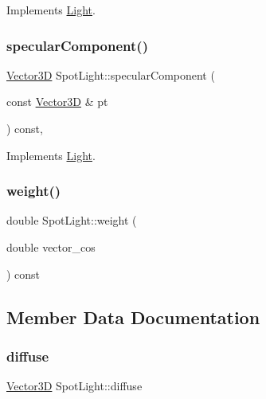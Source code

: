 Implements \mbox{\hyperlink{classLight_ac075908cf22e9ca9f289c1226d133664}{Light}}.

\mbox{\label{classSpotLight_a6a1cc6970bbb3308b5214f85641331cd}} 
\subsubsection{\texorpdfstring{specularComponent()}{specularComponent()}}
{\footnotesize\ttfamily \mbox{\hyperlink{classVector3D}{Vector3D}} Spot\+Light\+::specular\+Component (\begin{DoxyParamCaption}\item[{const \mbox{\hyperlink{classVector3D}{Vector3D}} \&}]{pt }\end{DoxyParamCaption}) const\hspace{0.3cm}{\ttfamily [override]}, {\ttfamily [virtual]}}



Implements \mbox{\hyperlink{classLight_a2a4cdf8081c2cab02757c2464610a32f}{Light}}.

\mbox{\label{classSpotLight_a7f32b04fa57511eb51d4fd820c023aff}} 
\subsubsection{\texorpdfstring{weight()}{weight()}}
{\footnotesize\ttfamily double Spot\+Light\+::weight (\begin{DoxyParamCaption}\item[{double}]{vector\+\_\+cos }\end{DoxyParamCaption}) const\hspace{0.3cm}{\ttfamily [private]}}



\subsection{Member Data Documentation}
\mbox{\label{classSpotLight_aad9742cfa7d1c049ad051bc87a996e04}} 
\subsubsection{\texorpdfstring{diffuse}{diffuse}}
{\footnotesize\ttfamily \mbox{\hyperlink{classVector3D}{Vector3D}} Spot\+Light\+::diffuse\hspace{0.3cm}{\ttfamily [private]}}

